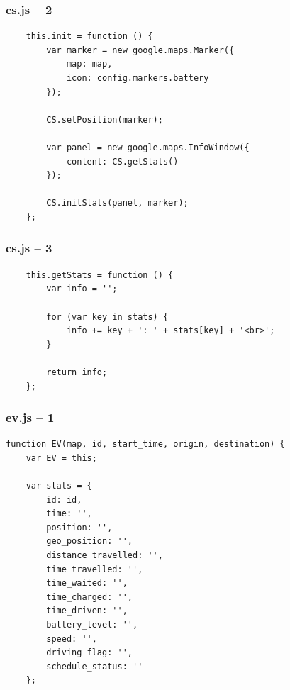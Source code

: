 \begin{frame}[fragile]
\frametitle{cs.js – 2}

\begin{verbatim}
    this.init = function () {
        var marker = new google.maps.Marker({
            map: map,
            icon: config.markers.battery
        });

        CS.setPosition(marker);

        var panel = new google.maps.InfoWindow({
            content: CS.getStats()
        });

        CS.initStats(panel, marker);
    };
\end{verbatim}

\end{frame}
\clearpage



\begin{frame}[fragile]
\frametitle{cs.js – 3}

\begin{verbatim}
    this.getStats = function () {
        var info = '';

        for (var key in stats) {
            info += key + ': ' + stats[key] + '<br>';
        }

        return info;
    };
\end{verbatim}

\end{frame}
\clearpage



\begin{frame}[fragile]
\frametitle{ev.js – 1}

\begin{verbatim}
function EV(map, id, start_time, origin, destination) {
    var EV = this;

    var stats = {
        id: id,
        time: '',
        position: '',
        geo_position: '',
        distance_travelled: '',
        time_travelled: '',
        time_waited: '',
        time_charged: '',
        time_driven: '',
        battery_level: '',
        speed: '',
        driving_flag: '',
        schedule_status: ''
    };
\end{verbatim}

\end{frame}
\clearpage



